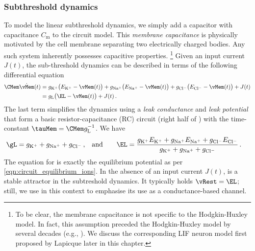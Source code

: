 \subsubsection{Subthreshold dynamics}
To model the linear subthreshold dynamics, we simply add a capacitor with capacitance $C_\mathrm{m}$ to the circuit model.
This \emph{membrane capacitance} is physically motivated by the cell membrane separating two electrically charged bodies.
Any such system inherently possesses capacitive properties.%
\footnote{To be clear, the membrane capacitance is not specific to the Hodgkin-Huxley model. In fact, this assumption preceded the Hodgkin-Huxley model by several decades (e.g., \cite{lapicque1907recherches}). We discuss the corresponding LIF neuron model first proposed by Lapicque later in this chapter.}
Given an input current $J(t)$, the sub-threshold dynamics can be described in terms of the following differential equation
\begin{align}
	\begin{aligned}
	\CMem \dot\vMem(t) &=
		  g_\mathrm{K^+} \bigl(E_\mathrm{K^+} - \vMem(t)\bigr)
		+ g_\mathrm{Na^+} \bigl(E_\mathrm{Na^+} - \vMem(t)\bigr)
		+ g_\mathrm{Cl^-} \bigl(E_\mathrm{Cl^-} - \vMem(t)\bigr) + J(t) \\ &=
	g_\mathrm{L} \bigl(\EL - \vMem(t)\bigr) + J(t) \,.
	\end{aligned}
\end{align}
The last term simplifies the dynamics using a \emph{leak conductance} \gL and \emph{leak potential} \EL that form a basic resistor-capacitance (RC) circuit (right half of ) with the time-constant $\tauMem = \CMem g_\mathrm{L}^{-1}$.
We have
\begin{align*}
	\gL &= g_\mathrm{K^+} + g_\mathrm{Na^+} + g_\mathrm{Cl^-} \,, &
	\text{and} \quad \quad \EL &= \frac{g_\mathrm{K^+} E_\mathrm{K^+} +
				 	g_\mathrm{Na^+} E_\mathrm{Na^+} + g_\mathrm{Cl^-} E_\mathrm{Cl^-}}{g_\mathrm{K^+} + g_\mathrm{Na^+} + g_\mathrm{Cl^-}} \,.
\end{align*}
The equation for \EL is exactly the equilibrium potential as per \cref{eqn:circuit_equilibrium_ions}.
In the absence of an input current $J(t)$, \EL is a stable attractor in the subtreshold dynamics.
It typically holds $\vRest = \EL$; still, we use \EL in this context to emphasise its use as a conductance-based channel.

